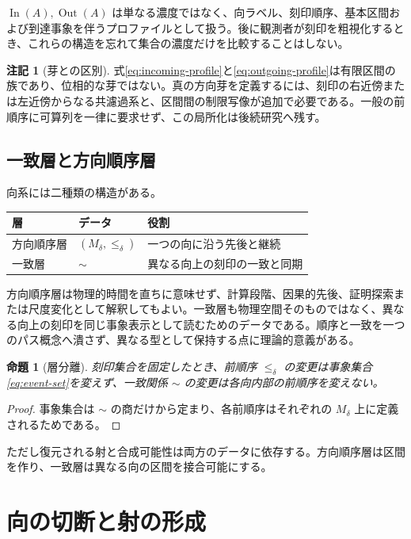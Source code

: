 \documentclass[a4paper,11pt]{ltjsarticle}
\theoremstyle{definition}
\newtheorem{remark}[definition]{注記}
\theoremstyle{plain}
\newtheorem{proposition}[definition]{命題}
\newcommand{\In}{\operatorname{In}}
\newcommand{\Out}{\operatorname{Out}}
\begin{document}
$\In(A),\Out(A)$ は単なる濃度ではなく、向ラベル、刻印順序、基本区間および到達事象を伴うプロファイルとして扱う。後に観測者が刻印を粗視化するとき、これらの構造を忘れて集合の濃度だけを比較することはしない。

\begin{remark}[芽との区別]
式\eqref{eq:incoming-profile}と\eqref{eq:outgoing-profile}は有限区間の族であり、位相的な芽ではない。真の方向芽を定義するには、刻印の右近傍または左近傍からなる共濾過系と、区間間の制限写像が追加で必要である。一般の前順序に可算列を一律に要求せず、この局所化は後続研究へ残す。
\end{remark}

\subsection{一致層と方向順序層}

向系には二種類の構造がある。
\begin{center}
\begin{tabular}{p{} p{} p{}}
\toprule
層 & データ & 役割 \\
\midrule
方向順序層 & $(M_\delta,\leq_\delta)$ & 一つの向に沿う先後と継続 \\
一致層 & $\sim$ & 異なる向上の刻印の一致と同期 \\
\bottomrule
\end{tabular}
\end{center}

方向順序層は物理的時間を直ちに意味せず、計算段階、因果的先後、証明探索または尺度変化として解釈してもよい。一致層も物理空間そのものではなく、異なる向上の刻印を同じ事象表示として読むためのデータである。順序と一致を一つのパス概念へ潰さず、異なる型として保持する点に理論的意義がある。

\begin{proposition}[層分離]
刻印集合を固定したとき、前順序 $\leq_\delta$ の変更は事象集合\eqref{eq:event-set}を変えず、一致関係 $\sim$ の変更は各向内部の前順序を変えない。
\end{proposition}

\begin{proof}
事象集合は $\sim$ の商だけから定まり、各前順序はそれぞれの $M_\delta$ 上に定義されるためである。
\end{proof}

ただし復元される射と合成可能性は両方のデータに依存する。方向順序層は区間を作り、一致層は異なる向の区間を接合可能にする。

\section{向の切断と射の形成}
\end{document}
